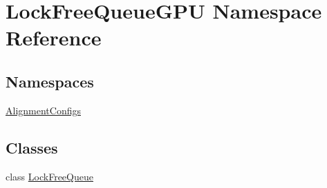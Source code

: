 \hypertarget{namespace_lock_free_queue_g_p_u}{}\section{Lock\+Free\+Queue\+G\+PU Namespace Reference}
\label{namespace_lock_free_queue_g_p_u}
\subsection*{Namespaces}
\begin{DoxyCompactItemize}
\item 
 \mbox{\hyperlink{namespace_lock_free_queue_g_p_u_1_1_alignment_configs}{Alignment\+Configs}}
\end{DoxyCompactItemize}
\subsection*{Classes}
\begin{DoxyCompactItemize}
\item 
class \mbox{\hyperlink{class_lock_free_queue_g_p_u_1_1_lock_free_queue}{Lock\+Free\+Queue}}
\end{DoxyCompactItemize}
